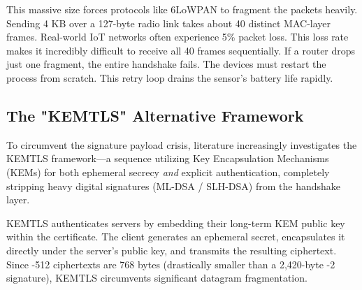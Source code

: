 This massive size forces protocols like 6LoWPAN to fragment the packets heavily. Sending 4 KB over a 127-byte radio link takes about 40 distinct MAC-layer frames. Real-world IoT networks often experience 5\% packet loss. This loss rate makes it incredibly difficult to receive all 40 frames sequentially. If a router drops just one fragment, the entire handshake fails. The devices must restart the process from scratch. This retry loop drains the sensor's battery life rapidly.

\begin{table}[htbp]
\caption{Network Communication Overhead and Fragmentation Scaling}
\label{tab:network_overhead}
\centering
{}
\end{table}

\subsection{The "KEMTLS" Alternative Framework}

To circumvent the signature payload crisis, literature increasingly investigates the KEMTLS framework—a sequence utilizing Key Encapsulation Mechanisms (KEMs) for both ephemeral secrecy \textit{and} explicit authentication, completely stripping heavy digital signatures (ML-DSA / SLH-DSA) from the handshake layer.

KEMTLS authenticates servers by embedding their long-term KEM public key within the certificate. The client generates an ephemeral secret, encapsulates it directly under the server's public key, and transmits the resulting ciphertext. Since \kyber{}-512 ciphertexts are 768 bytes (drastically smaller than a 2,420-byte \dilithium{}-2 signature), KEMTLS circumvents significant datagram fragmentation. 

